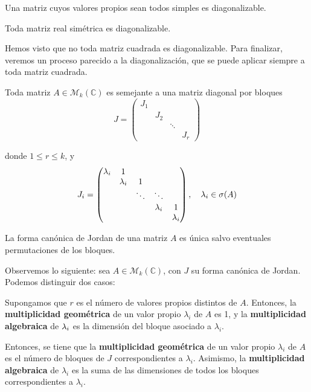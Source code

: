 \begin{ncor} \hfill
  \begin{nlist}
  \item Una matriz cuyos valores propios sean todos simples es diagonalizable.
  \item Toda matriz real simétrica es diagonalizable.
  \end{nlist}
\end{ncor}

Hemos visto que no toda matriz cuadrada es diagonalizable. Para finalizar, veremos un proceso parecido a la diagonalización, que se puede aplicar siempre a toda matriz cuadrada.

\begin{nth}
  Toda matriz $A \in \mathcal M_k (\mathbb C)$ es semejante a una matriz
  diagonal por bloques $$ J =
  \begin{pmatrix}
    J_1 & & & \\
    & J_2 & & \\
    & & \ddots & \\
    & & & J_r
  \end{pmatrix}$$

  donde $1 \leq r \leq k$, y $$J_i =
  \begin{pmatrix}
	\lambda_i & 1\\
	& \lambda_i & 1 \\
	& & \ddots & \ddots \\
	& & & \lambda_i & 1 \\
	& & & & \lambda_i
\end{pmatrix}, \quad \lambda_i \in \sigma(A)$$

\end{nth}

\begin{nota}
	La forma canónica de Jordan de una matriz $A$ es única salvo eventuales permutaciones de los bloques.
\end{nota}

Observemos lo siguiente: sea $A \in \mathcal M_k(\mathbb{C})$, con $J$ su forma canónica de Jordan. Podemos distinguir dos casos:

\begin{nlist}
	\item Supongamos que $r$ es el número de valores propios distintos de $A$. Entonces, la \textbf{multiplicidad geométrica} de un valor propio $\lambda_i$ de $A$ es 1, y la \textbf{multiplicidad algebraica} de $\lambda_i$ es la dimensión del bloque asociado a $\lambda_i$.

	\item Entonces, se tiene que la \textbf{multiplicidad geométrica} de un valor propio $\lambda_i$ de $A$ es el número de bloques de $J$ correspondientes a $\lambda_i$. Asimismo, la \textbf{multiplicidad algebraica} de $\lambda_i$ es la suma de las dimensiones de todos los bloques correspondientes a $\lambda_i$.
\end{nlist}

